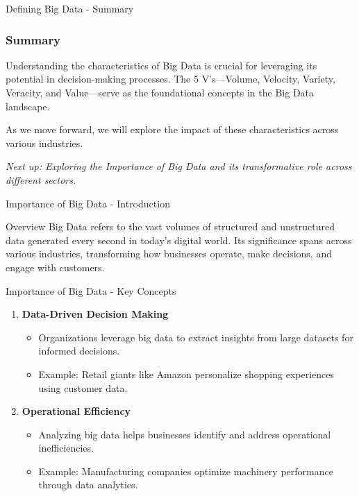 \documentclass[aspectratio=169]{beamer}
\begin{document}
\begin{frame}[fragile]{Defining Big Data - Summary}
    \frametitle{Summary}
    
    Understanding the characteristics of Big Data is crucial for leveraging its potential in decision-making processes. The 5 V's—Volume, Velocity, Variety, Veracity, and Value—serve as the foundational concepts in the Big Data landscape. 

    As we move forward, we will explore the impact of these characteristics across various industries.

    \textit{Next up: Exploring the Importance of Big Data and its transformative role across different sectors.}
\end{frame}

\begin{frame}[fragile]{Importance of Big Data - Introduction}
  \begin{block}{Overview}
    Big Data refers to the vast volumes of structured and unstructured data generated every second in today's digital world. Its significance spans across various industries, transforming how businesses operate, make decisions, and engage with customers.
  \end{block}
\end{frame}

\begin{frame}[fragile]{Importance of Big Data - Key Concepts}
  \begin{enumerate}
    \item \textbf{Data-Driven Decision Making}
      \begin{itemize}
        \item Organizations leverage big data to extract insights from large datasets for informed decisions.
        \item Example: Retail giants like Amazon personalize shopping experiences using customer data.
      \end{itemize}
      
    \item \textbf{Operational Efficiency}
      \begin{itemize}
        \item Analyzing big data helps businesses identify and address operational inefficiencies.
        \item Example: Manufacturing companies optimize machinery performance through data analytics.
      \end{itemize}
  \end{enumerate}
\end{frame}
\end{document}
